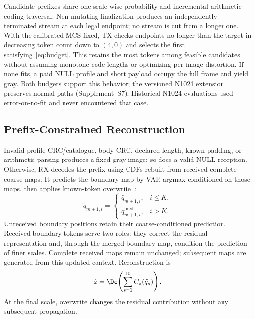 Candidate prefixes share one scale-wise probability and incremental arithmetic-coding traversal. Non-mutating finalization produces an independently terminated stream at each legal endpoint; no stream is cut from a longer one. With the calibrated MCS fixed, TX checks endpoints no longer than the target in decreasing token count down to $(4,0)$ and selects the first satisfying~\eqref{eq:budget}. This retains the most tokens among feasible candidates without assuming monotone code lengths or optimizing per-image distortion. If none fits, a paid NULL profile and short payload occupy the full frame and yield gray. Both budgets support this behavior; the versioned N1024 extension preserves normal paths (Supplement~S7). Historical N1024 evaluations used error-on-no-fit and never encountered that case.

\ifCLASSOPTIONonecolumn\else\fi
\subsection{Prefix-Constrained Reconstruction}
Invalid profile CRC/catalogue, body CRC, declared length, known padding, or arithmetic parsing produces a fixed gray image; so does a valid NULL reception. Otherwise, RX decodes the prefix using CDFs rebuilt from received complete coarse maps. It predicts the boundary map by VAR argmax conditioned on those maps, then applies known-token overwrite~\cite{var}:
\begin{equation}
 \tilde q_{m+1,i}=\begin{cases}\hat q_{m+1,i},&i\leq K,\\q^{\mathrm{pred}}_{m+1,i},&i>K.\end{cases}
 \label{eq:overwrite}
\end{equation}
Unreceived boundary positions retain their coarse-conditioned prediction. Received boundary tokens serve two roles: they correct the residual representation and, through the merged boundary map, condition the prediction of finer scales. Complete received maps remain unchanged; subsequent maps are generated from this updated context. Reconstruction is
\begin{equation}
 \hat x=\Dc\!\left(\sum_{s=1}^{10}C_s(\tilde q_s)\right).
 \label{eq:reconstruction}
\end{equation}
At the final scale, overwrite changes the residual contribution without any subsequent propagation.
